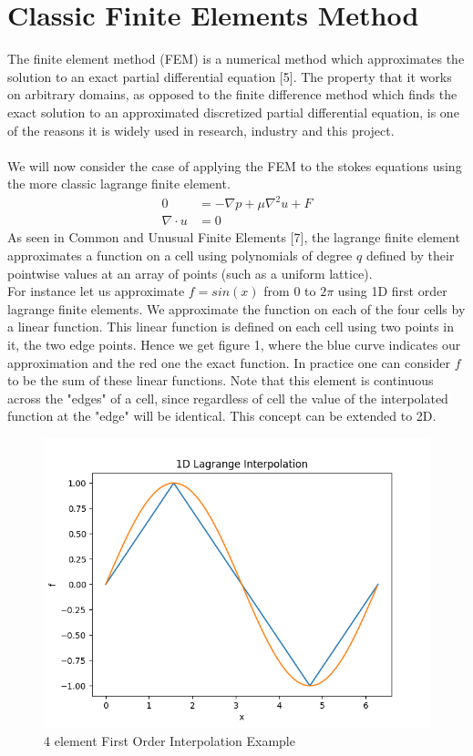 \documentclass[11pt,twoside,a4paper]{article}
\begin{document}
\section{Classic Finite Elements Method}
The finite element method (FEM) is a numerical method which approximates the solution to an exact partial differential equation [5]. The property that it works on arbitrary domains, as opposed to the finite difference method which finds the exact solution to an approximated discretized partial differential equation, is one of the reasons it is widely used in research, industry and this project.\\
\\
We will now consider the case of applying the FEM to the stokes equations using the more classic lagrange finite element.\\
\begin{align}
0 &= -\nabla p + \mu \nabla^2 u + F \\
\nabla \cdot u &= 0
\end{align}
As seen in Common and Unusual Finite Elements [7], the lagrange finite element approximates a function on a cell using polynomials of degree $q$ defined by their pointwise values at an array of points (such as a uniform lattice).\\
For instance let us approximate $f = sin(x)$ from $0$ to $2 \pi$ using 1D first order lagrange finite elements. We approximate the function on each of the four cells by a linear function. This linear function is defined on each cell using two points in it, the two edge points. Hence we get figure 1, where the blue curve indicates our approximation and the red one the exact function. In practice one can consider $f$ to be the sum of these linear functions. Note that this element is continuous across the "edges" of a cell, since regardless of cell the value of the interpolated function at the "edge" will be identical. This concept can be extended to 2D.\\
\begin{figure}
  \includegraphics[width=\linewidth]{ex_1D_LG.png}
  \caption{4 element First Order Interpolation Example}
\end{figure}
\end{document}

